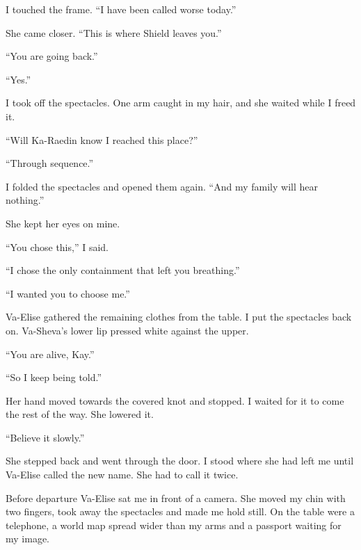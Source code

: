 I touched the frame. ``I have been called worse today.''\par

She came closer. ``This is where Shield leaves you.''\par

``You are going back.''\par

``Yes.''\par

I took off the spectacles. One arm caught in my hair, and she waited while I freed it.\par

``Will Ka-Raedin know I reached this place?''\par

``Through sequence.''\par

I folded the spectacles and opened them again. ``And my family will hear nothing.''\par

She kept her eyes on mine.\par

``You chose this,'' I said.\par

``I chose the only containment that left you breathing.''\par

``I wanted you to choose me.''\par

Va-Elise gathered the remaining clothes from the table. I put the spectacles back on. Va-Sheva's lower lip pressed white against the upper.\par

``You are alive, Kay.''\par

``So I keep being told.''\par

Her hand moved towards the covered knot and stopped. I waited for it to come the rest of the way. She lowered it.\par

``Believe it slowly.''\par

She stepped back and went through the door. I stood where she had left me until Va-Elise called the new name. She had to call it twice.\par

\ornament

Before departure Va-Elise sat me in front of a camera. She moved my chin with two fingers, took away the spectacles and made me hold still. On the table were a telephone, a world map spread wider than my arms and a passport waiting for my image.\par

